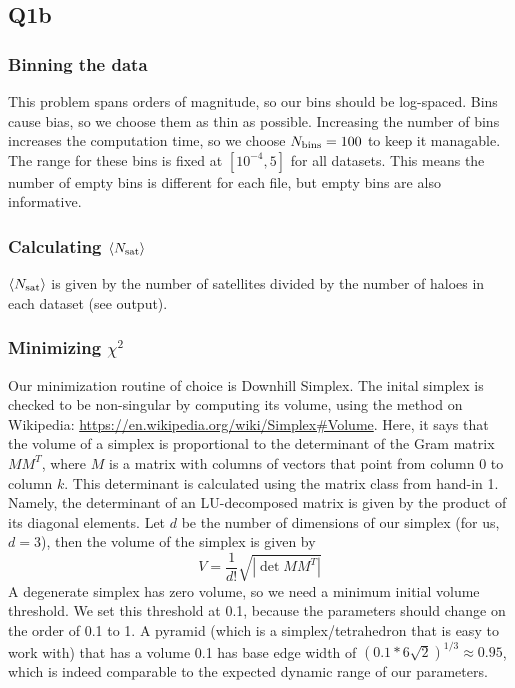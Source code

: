 \subsection{Q1b}

\subsubsection{Binning the data}

This problem spans orders of magnitude, so our bins should be log-spaced. Bins cause bias, so we choose them as thin as possible. Increasing
the number of bins increases the computation time, so we choose $N_{\rm bins} = 100$ to keep it managable. The range for these bins is fixed
at $[10^{-4}, 5]$ for all datasets. This means the number of empty bins is different for each file, but empty bins are also informative.

\subsubsection{Calculating $\langle N_{\rm sat} \rangle$}
$\langle N_{\rm sat} \rangle$ is given by the number of satellites divided by the number of haloes in each dataset (see output).

\subsubsection{Minimizing $\chi^{2}$}
Our minimization routine of choice is Downhill Simplex. The inital simplex is checked to be non-singular by computing its volume, using the method on 
Wikipedia: \url{https://en.wikipedia.org/wiki/Simplex#Volume}. Here, it says that the volume of a simplex is proportional to the determinant of the
Gram matrix $MM^{T}$, where $M$ is a matrix with columns of vectors that point from column 0 to column $k$. This determinant is calculated using the
matrix class from hand-in 1. Namely, the determinant of an LU-decomposed matrix is given by the product of its diagonal elements. Let $d$ be the
number of dimensions of our simplex (for us, $d=3$), then the volume of the simplex is given by
\begin{equation}
    V = \frac{1}{d!}\sqrt{|\det{MM^{T}}|}
\end{equation}
A degenerate simplex has zero volume, so we need a minimum initial volume threshold. We set this threshold at 0.1, because the parameters should change 
on the order of 0.1 to 1. A pyramid (which is a simplex/tetrahedron that is easy to work with) that has a volume 0.1 has base edge width of 
$(0.1 * 6 \sqrt{2})^{1/3} \approx 0.95$, which is indeed comparable to the expected dynamic range of our parameters.

